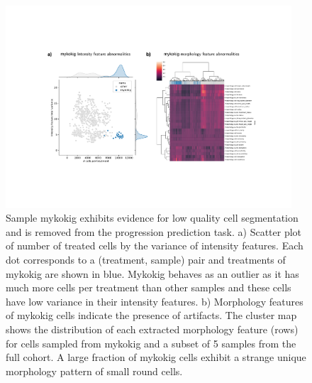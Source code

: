 \begin{figure}
  \begin{center}
    \includegraphics[width=0.95\textwidth]{figures/cellot-cohort/progression-exclude-mykokig.pdf}
  \end{center}
  \caption{
    Sample mykokig exhibits evidence for low quality cell segmentation and is removed from the progression prediction task.
  a) Scatter plot of number of treated cells by the variance of intensity features.  Each dot corresponds to a (treatment, sample) pair and treatments of mykokig are shown in blue. Mykokig behaves as an outlier as it has much more cells per treatment than other samples and these cells have low variance in their intensity features.
  b) Morphology features of mykokig cells indicate the presence of artifacts. The cluster map shows the distribution of each extracted morphology feature (rows) for cells sampled from mykokig and a subset of 5 samples from the full cohort. A large fraction of mykokig cells exhibit a strange unique morphology pattern of small round cells.
  }\label{fig:progression-exclude-mykokig}
\end{figure}

